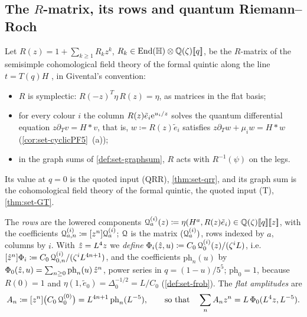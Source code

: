 
\subsection{The \texorpdfstring{$R$}{R}-matrix, its rows and quantum Riemann--Roch}
\label{sec:set-rows}

\begin{defn}
\label{def:set-rows}
Let $R(z)=1+\sum_{k\geq1}R_kz^k$, $R_k\in\operatorname{End}(\mathbb{H})\otimes\mathbb{Q}(\zeta)[\![ q ]\!]$, be the $R$-matrix of the semisimple cohomological field theory of the formal quintic along the line $t=T(q)H$ \cite[Section~4.1]{GJR18}, in Givental's convention:
\begin{itemize}
\item[(a)] $R$ is symplectic: $R(-z)^T\eta\,R(z)=\eta$, as matrices in the flat basis;
\item[(b)] for every colour $i$ the column $R(z)\tilde e_i\mathrm{e}^{u_i/z}$ solves the quantum differential equation $z\partial_Tv=H*v$, that is, $w\coloneqq R(z)\tilde e_i$ satisfies $z\partial_Tw+\mu_iw=H*w$ (\cref{cor:set-cyclicPF5}~(a));
\item[(c)] in the graph sums of \cref{def:set-graphsum}, $R$ acts with $R^{-1}(\psi)$ on the legs.
\end{itemize}
Its value at $q=0$ is the quoted input (QRR), \cref{thm:set-qrr}, and its graph sum is the cohomological field theory of the formal quintic, the quoted input (T), \cref{thm:set-GT}.

The \emph{rows} are the lowered components $\mathcal{Q}^{(i)}_a(z)\coloneqq\eta(H^a,R(z)\tilde e_i)\in\mathbb{Q}(\zeta)[\![ q ]\!][\![ z ]\!]$, with the coefficients $\mathcal{Q}^{(i)}_{a,n}\coloneqq[z^n]\mathcal{Q}^{(i)}_a$; $\mathcal{Q}$ is the matrix $(\mathcal{Q}^{(i)}_a)$, rows indexed by $a$, columns by $i$. With $\hat{z}=L^4z$ we \emph{define} $\Phi_i(\hat{z},u)\coloneqq C_0\,\mathcal{Q}^{(i)}_0(z)/(\zeta^iL)$, i.e.\ $[\hat{z}^n]\Phi_i\coloneqq C_0\,\mathcal{Q}^{(i)}_{0,n}/(\zeta^iL^{4n+1})$, and the coefficients $\mathrm{ph}_n(u)$ by $\Phi_0(\hat{z},u)=\sum_{n\geq0}\mathrm{ph}_n(u)\,\hat{z}^n$, power series in $q=(1-u)/5^5$; $\mathrm{ph}_0=1$, because $R(0)=1$ and $\eta(1,\tilde e_0)=\Delta_0^{-1/2}=L/C_0$ (\cref{def:set-frob}). The \emph{flat amplitudes} are
\[
A_n\coloneqq[z^n]\bigl(C_0\,\mathcal{Q}^{(0)}_0\bigr)=L^{4n+1}\,\mathrm{ph}_n(L^{-5}),\qquad\text{so that}\quad\sum_nA_nz^n=L\,\Phi_0(L^4z,L^{-5}).
\]
\end{defn}

